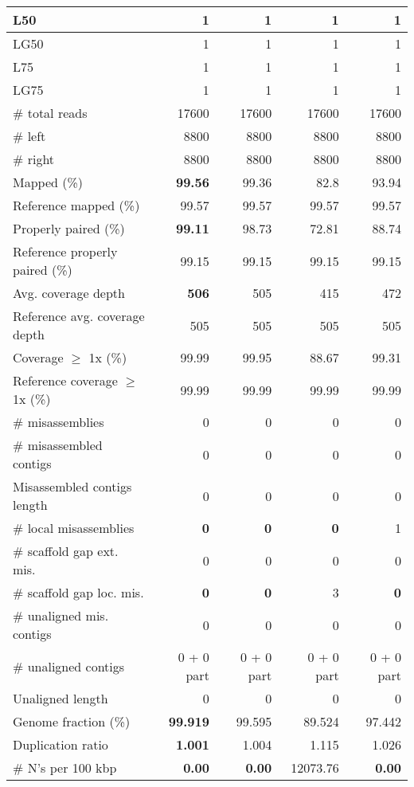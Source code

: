 \documentclass[12pt,a4paper]{article}
\begin{document}
\begin{table}[ht]
\begin{center}
\begin{tabular}{|l*{4}{|r}|}
L50 & 1 & 1 & 1 & 1 \\ \hline
LG50 & 1 & 1 & 1 & 1 \\ \hline
L75 & 1 & 1 & 1 & 1 \\ \hline
LG75 & 1 & 1 & 1 & 1 \\ \hline
\# total reads & 17600 & 17600 & 17600 & 17600 \\ \hline
\# left & 8800 & 8800 & 8800 & 8800 \\ \hline
\# right & 8800 & 8800 & 8800 & 8800 \\ \hline
Mapped (\%) & {\bf 99.56} & 99.36 & 82.8 & 93.94 \\ \hline
Reference mapped (\%) & 99.57 & 99.57 & 99.57 & 99.57 \\ \hline
Properly paired (\%) & {\bf 99.11} & 98.73 & 72.81 & 88.74 \\ \hline
Reference properly paired (\%) & 99.15 & 99.15 & 99.15 & 99.15 \\ \hline
Avg. coverage depth & {\bf 506} & 505 & 415 & 472 \\ \hline
Reference avg. coverage depth & 505 & 505 & 505 & 505 \\ \hline
Coverage $\geq$ 1x (\%) & 99.99 & 99.95 & 88.67 & 99.31 \\ \hline
Reference coverage $\geq$ 1x (\%) & 99.99 & 99.99 & 99.99 & 99.99 \\ \hline
\# misassemblies & 0 & 0 & 0 & 0 \\ \hline
\# misassembled contigs & 0 & 0 & 0 & 0 \\ \hline
Misassembled contigs length & 0 & 0 & 0 & 0 \\ \hline
\# local misassemblies & {\bf 0} & {\bf 0} & {\bf 0} & 1 \\ \hline
\# scaffold gap ext. mis. & 0 & 0 & 0 & 0 \\ \hline
\# scaffold gap loc. mis. & {\bf 0} & {\bf 0} & 3 & {\bf 0} \\ \hline
\# unaligned mis. contigs & 0 & 0 & 0 & 0 \\ \hline
\# unaligned contigs & 0 + 0 part & 0 + 0 part & 0 + 0 part & 0 + 0 part \\ \hline
Unaligned length & 0 & 0 & 0 & 0 \\ \hline
Genome fraction (\%) & {\bf 99.919} & 99.595 & 89.524 & 97.442 \\ \hline
Duplication ratio & {\bf 1.001} & 1.004 & 1.115 & 1.026 \\ \hline
\# N's per 100 kbp & {\bf 0.00} & {\bf 0.00} & 12073.76 & {\bf 0.00} \\ \hline

\end{tabular}
\end{center}
\end{table}
\end{document}
